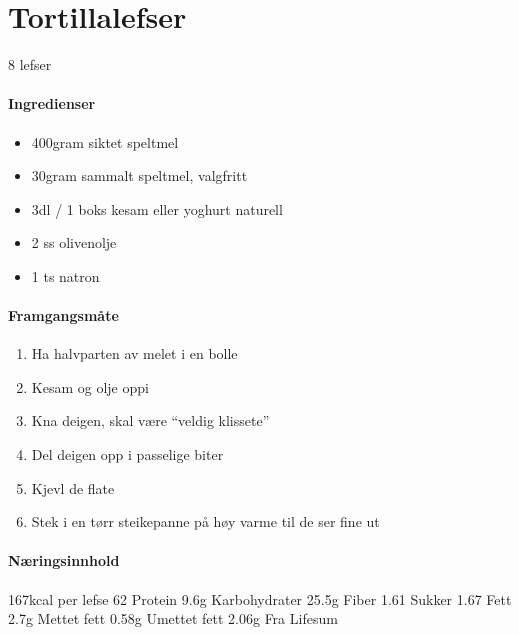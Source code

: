 \section{﻿Tortillalefser}
\label{tortillalefser}
8 lefser

\paragraph{Ingredienser}
\begin{itemize}[noitemsep]
	\item 400gram siktet speltmel
	\item 30gram sammalt speltmel, valgfritt
	\item 3dl / 1 boks kesam eller yoghurt naturell
	\item 2 ss olivenolje
	\item 1 ts natron
\end{itemize}

\paragraph{Framgangsmåte}
\begin{enumerate}[noitemsep]
	\item Ha halvparten av melet i en bolle
	\item Kesam og olje oppi
	\item Kna deigen, skal være “veldig klissete”
	\item Del deigen opp i passelige biter
	\item Kjevl de flate
	\item Stek i en tørr steikepanne på høy varme til de ser fine ut
\end{enumerate}

\paragraph{Næringsinnhold}
167kcal per lefse
62%
Protein 9.6g
Karbohydrater 25.5g
	Fiber 1.61
	Sukker 1.67
Fett 2.7g
	Mettet fett 0.58g
	Umettet fett 2.06g
Fra Lifesum
